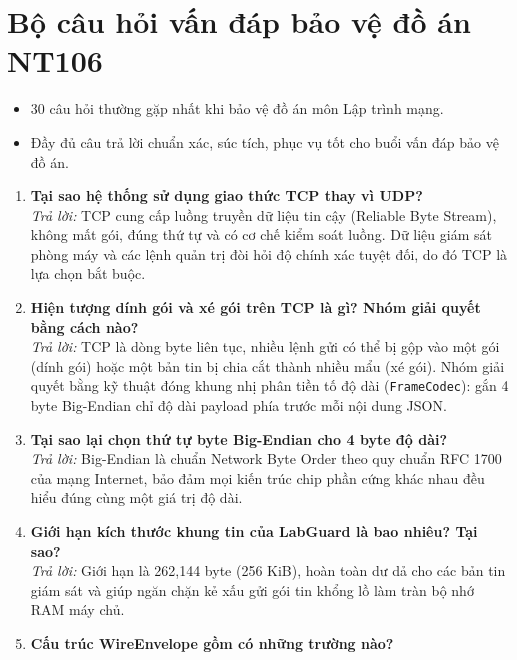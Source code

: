 \documentclass[12pt,a4paper]{article}
\begin{document}
\section{Bộ câu hỏi vấn đáp bảo vệ đồ án NT106}

\begin{summarybox}
\begin{itemize}[leftmargin=1.5em, itemsep=1pt]
  \item 30 câu hỏi thường gặp nhất khi bảo vệ đồ án môn Lập trình mạng.
  \item Đầy đủ câu trả lời chuẩn xác, súc tích, phục vụ tốt cho buổi vấn đáp bảo vệ đồ án.
\end{itemize}
\end{summarybox}

\begin{enumerate}[leftmargin=*, label=\textbf{Câu \arabic*:}]
  \item \textbf{Tại sao hệ thống sử dụng giao thức TCP thay vì UDP?} \\
    \textit{Trả lời:} TCP cung cấp luồng truyền dữ liệu tin cậy (Reliable Byte Stream), không mất gói, đúng thứ tự và có cơ chế kiểm soát luồng. Dữ liệu giám sát phòng máy và các lệnh quản trị đòi hỏi độ chính xác tuyệt đối, do đó TCP là lựa chọn bắt buộc.
  \item \textbf{Hiện tượng dính gói và xé gói trên TCP là gì? Nhóm giải quyết bằng cách nào?} \\
    \textit{Trả lời:} TCP là dòng byte liên tục, nhiều lệnh gửi có thể bị gộp vào một gói (dính gói) hoặc một bản tin bị chia cắt thành nhiều mẩu (xé gói). Nhóm giải quyết bằng kỹ thuật đóng khung nhị phân tiền tố độ dài (\texttt{FrameCodec}): gắn 4 byte Big-Endian chỉ độ dài payload phía trước mỗi nội dung JSON.
  \item \textbf{Tại sao lại chọn thứ tự byte Big-Endian cho 4 byte độ dài?} \\
    \textit{Trả lời:} Big-Endian là chuẩn Network Byte Order theo quy chuẩn RFC 1700 của mạng Internet, bảo đảm mọi kiến trúc chip phần cứng khác nhau đều hiểu đúng cùng một giá trị độ dài.
  \item \textbf{Giới hạn kích thước khung tin của LabGuard là bao nhiêu? Tại sao?} \\
    \textit{Trả lời:} Giới hạn là 262,144 byte (256 KiB), hoàn toàn dư dả cho các bản tin giám sát và giúp ngăn chặn kẻ xấu gửi gói tin khổng lồ làm tràn bộ nhớ RAM máy chủ.
  \item \textbf{Cấu trúc WireEnvelope gồm có những trường nào?} \\

\end{enumerate}
\end{document}
